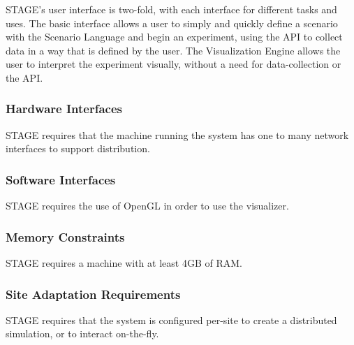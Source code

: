 \documentclass[titlepage]{article}
\begin{document}
STAGE's user interface is two-fold, with each interface for different tasks and uses. The basic interface allows a user to simply and quickly define a scenario with the Scenario Language and begin an experiment, using the API to collect data in a way that is defined by the user. The Visualization Engine allows the user to interpret the experiment visually, without a need for data-collection or the API.


\subsubsection{Hardware Interfaces%
  \label{hardware-interfaces}%
}

STAGE requires that the machine running the system has one to many network interfaces to support distribution.


\subsubsection{Software Interfaces%
  \label{software-interfaces}%
}

STAGE requires the use of OpenGL in order to use the visualizer.


\subsubsection{Memory Constraints%
  \label{memory-constraints}%
}

STAGE requires a machine with at least 4GB of RAM.


\subsubsection{Site Adaptation Requirements%
  \label{site-adaptation-requirements}%
}

STAGE requires that the system is configured per-site to create a distributed simulation, or to interact on-the-fly.

\end{document}
